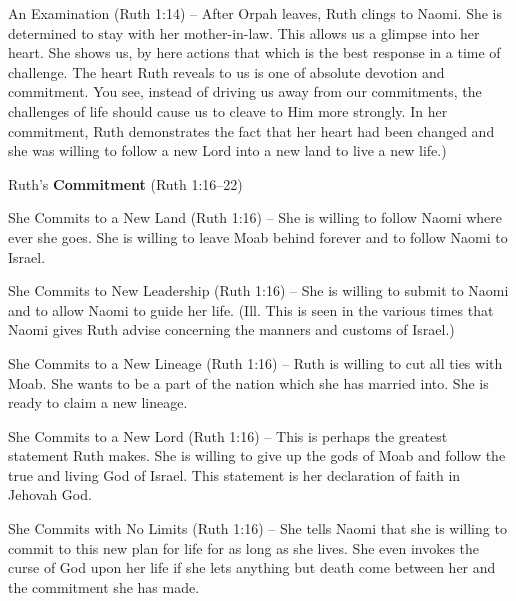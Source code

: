 \begin{compactenum}[I.][7]
\begin{compactenum}[A.][7]
    	\item An Examination (Ruth 1:14) -- After Orpah leaves, Ruth clings to Naomi. She is determined to stay with her mother-in-law. This allows us a glimpse into her heart. She shows us, by here actions that which is the best response in a time of challenge. The heart Ruth reveals to us is one of absolute devotion and commitment. You see, instead of driving us away from our commitments, the challenges of life should cause us to cleave to Him more strongly. In her commitment, Ruth demonstrates the fact that her heart had been changed and she was willing to follow a new Lord into a new land to live a new life.)
    \end{compactenum}
    \item Ruth's \textbf{Commitment} (Ruth 1:16--22)
    \begin{compactenum}[A.][7]
    	\item She Commits to a New Land (Ruth 1:16) -- She is willing to follow Naomi where ever she goes. She is willing to leave Moab behind forever and to follow Naomi to Israel.
    	\item She Commits to New Leadership (Ruth 1:16) -- She is willing to submit to Naomi and to allow Naomi to guide her life. (Ill. This is seen in the various times that Naomi gives Ruth advise concerning the manners and customs of Israel.)
    	\item She Commits to a New Lineage (Ruth 1:16) -- Ruth is willing to cut all ties with Moab. She wants to be a part of the nation which she has married into. She is ready to claim a new lineage.
    	\item She Commits to a New Lord (Ruth 1:16) -- This is perhaps the greatest statement Ruth makes. She is willing to give up the gods of Moab and follow the true and living God of Israel. This statement is her declaration of faith in Jehovah God.
    	\item She Commits with No Limits (Ruth 1:16) -- She tells Naomi that she is willing to commit to this new plan for life for as long as she lives. She even invokes the curse of God upon her life if she lets anything but death come between her and the commitment she has made.
    \end{compactenum}
\end{compactenum}
